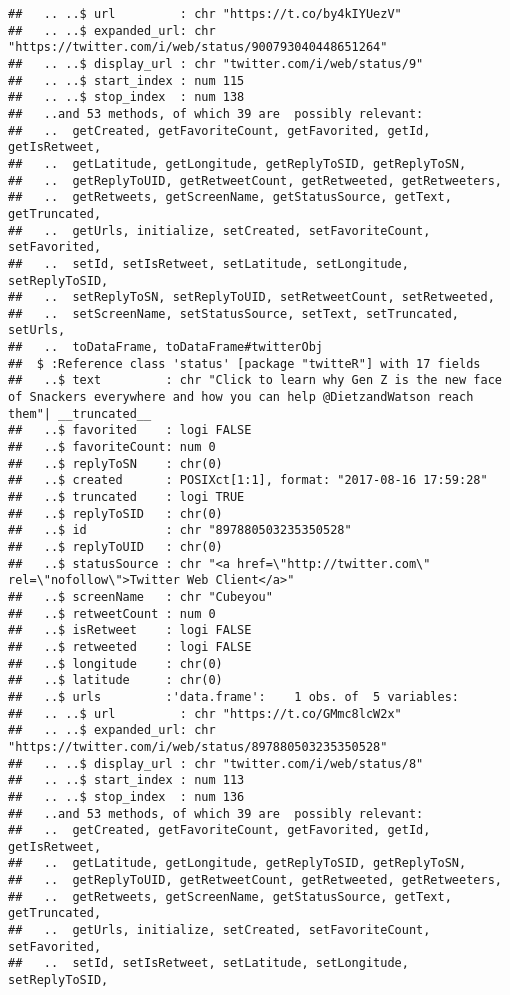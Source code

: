 \documentclass[]{article}
\begin{document}
\begin{verbatim}
##   .. ..$ url         : chr "https://t.co/by4kIYUezV"
##   .. ..$ expanded_url: chr "https://twitter.com/i/web/status/900793040448651264"
##   .. ..$ display_url : chr "twitter.com/i/web/status/9"
##   .. ..$ start_index : num 115
##   .. ..$ stop_index  : num 138
##   ..and 53 methods, of which 39 are  possibly relevant:
##   ..  getCreated, getFavoriteCount, getFavorited, getId, getIsRetweet,
##   ..  getLatitude, getLongitude, getReplyToSID, getReplyToSN,
##   ..  getReplyToUID, getRetweetCount, getRetweeted, getRetweeters,
##   ..  getRetweets, getScreenName, getStatusSource, getText, getTruncated,
##   ..  getUrls, initialize, setCreated, setFavoriteCount, setFavorited,
##   ..  setId, setIsRetweet, setLatitude, setLongitude, setReplyToSID,
##   ..  setReplyToSN, setReplyToUID, setRetweetCount, setRetweeted,
##   ..  setScreenName, setStatusSource, setText, setTruncated, setUrls,
##   ..  toDataFrame, toDataFrame#twitterObj
##  $ :Reference class 'status' [package "twitteR"] with 17 fields
##   ..$ text         : chr "Click to learn why Gen Z is the new face of Snackers everywhere and how you can help @DietzandWatson reach them"| __truncated__
##   ..$ favorited    : logi FALSE
##   ..$ favoriteCount: num 0
##   ..$ replyToSN    : chr(0) 
##   ..$ created      : POSIXct[1:1], format: "2017-08-16 17:59:28"
##   ..$ truncated    : logi TRUE
##   ..$ replyToSID   : chr(0) 
##   ..$ id           : chr "897880503235350528"
##   ..$ replyToUID   : chr(0) 
##   ..$ statusSource : chr "<a href=\"http://twitter.com\" rel=\"nofollow\">Twitter Web Client</a>"
##   ..$ screenName   : chr "Cubeyou"
##   ..$ retweetCount : num 0
##   ..$ isRetweet    : logi FALSE
##   ..$ retweeted    : logi FALSE
##   ..$ longitude    : chr(0) 
##   ..$ latitude     : chr(0) 
##   ..$ urls         :'data.frame':    1 obs. of  5 variables:
##   .. ..$ url         : chr "https://t.co/GMmc8lcW2x"
##   .. ..$ expanded_url: chr "https://twitter.com/i/web/status/897880503235350528"
##   .. ..$ display_url : chr "twitter.com/i/web/status/8"
##   .. ..$ start_index : num 113
##   .. ..$ stop_index  : num 136
##   ..and 53 methods, of which 39 are  possibly relevant:
##   ..  getCreated, getFavoriteCount, getFavorited, getId, getIsRetweet,
##   ..  getLatitude, getLongitude, getReplyToSID, getReplyToSN,
##   ..  getReplyToUID, getRetweetCount, getRetweeted, getRetweeters,
##   ..  getRetweets, getScreenName, getStatusSource, getText, getTruncated,
##   ..  getUrls, initialize, setCreated, setFavoriteCount, setFavorited,
##   ..  setId, setIsRetweet, setLatitude, setLongitude, setReplyToSID,

\end{verbatim}
\end{document}
